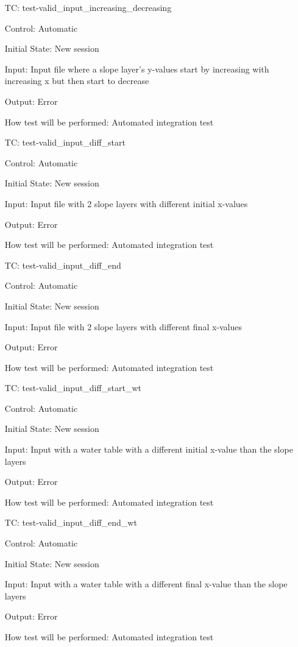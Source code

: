 \documentclass[12pt, titlepage]{article}
\newcounter{testnum} %
\begin{document}
\begin{enumerate}[label=TC\arabic*:,ref={\arabic*}]
	
	\item [TC\refstepcounter{testnum}\thetestnum: \label{TC_InvalidInIncDec}] 
	test-valid\_input\_increasing\_decreasing
	
	Control: Automatic
	
	Initial State: New session
	
	Input: Input file where a slope layer's y-values start by increasing with 
	increasing x but then start to decrease
	
	Output: Error
	
	How test will be performed: Automated integration test
	
	\item [TC\refstepcounter{testnum}\thetestnum: 
	\label{TC_InvalidInDiffStart}] 
	test-valid\_input\_diff\_start
	
	Control: Automatic
	
	Initial State: New session
	
	Input: Input file with 2 slope layers with different initial x-values
	
	Output: Error
	
	How test will be performed: Automated integration test
	
	\item [TC\refstepcounter{testnum}\thetestnum: \label{TC_InvalidInDiffEnd}] 
	test-valid\_input\_diff\_end
	
	Control: Automatic
	
	Initial State: New session
	
	Input: Input file with 2 slope layers with different final x-values
	
	Output: Error
	
	How test will be performed: Automated integration test
	
	\item [TC\refstepcounter{testnum}\thetestnum: 
	\label{TC_InvalidInDiffStartWT}] 
	test-valid\_input\_diff\_start\_wt
	
	Control: Automatic
	
	Initial State: New session
	
	Input: Input with a water table with a different initial x-value than the 
	slope layers
	
	Output: Error
	
	How test will be performed: Automated integration test
	
	\item [TC\refstepcounter{testnum}\thetestnum: 
	\label{TC_InvalidInDiffEndWT}] 
	test-valid\_input\_diff\_end\_wt
	
	Control: Automatic
	
	Initial State: New session
	
	Input: Input with a water table with a different final x-value than the 
	slope layers
	
	Output: Error
	
	How test will be performed: Automated integration test
	
\end{enumerate}
\end{document}
